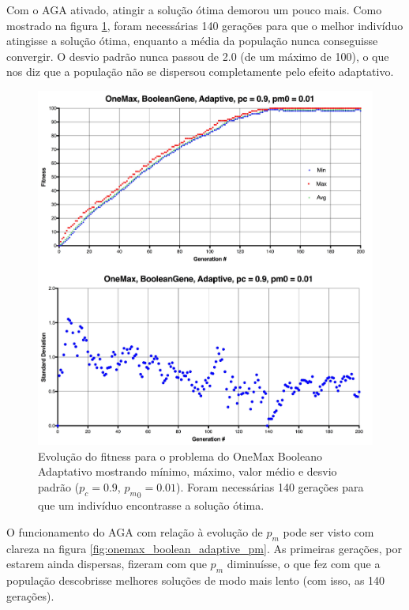 Com o AGA ativado, atingir a solução ótima demorou um pouco mais. Como mostrado na figura \ref{fig:onemax_boolean_adaptive}, foram necessárias 140 gerações para que o melhor indivíduo atingisse a solução ótima, enquanto a média da população nunca conseguisse convergir. O desvio padrão nunca passou de 2.0 (de um máximo de 100), o que nos diz que a população não se dispersou completamente pelo efeito adaptativo.

\begin{figure}[ht!]
    \centering \includegraphics[width=1.0\textwidth]{onemax_boolean_adaptive.jpg}
    \caption{Evolução do fitness para o problema do OneMax Booleano Adaptativo mostrando mínimo, máximo, valor médio e desvio padrão ($p_c=0.9$, ${p_m}_0=0.01$). Foram necessárias 140 gerações para que um indivíduo encontrasse a solução ótima.}
    \label{fig:onemax_boolean_adaptive}
\end{figure}

O funcionamento do AGA com relação à evolução de $p_m$ pode ser visto com clareza na figura \ref{fig:onemax_boolean_adaptive_pm}. As primeiras gerações, por estarem ainda dispersas, fizeram com que $p_m$ diminuísse, o que fez com que a população descobrisse melhores soluções de modo mais lento (com isso, as 140 gerações).

